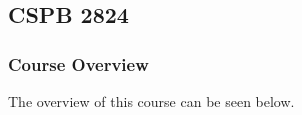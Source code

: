 \clearpage

\renewcommand{\ChapTitle}{\CSPBDisc}
\renewcommand{\SectionTitle}{CSPB 2824}

\chapter{\ChapTitle}
\section{\SectionTitle}

\subsection{Course Overview}

The overview of this course can be seen below.

